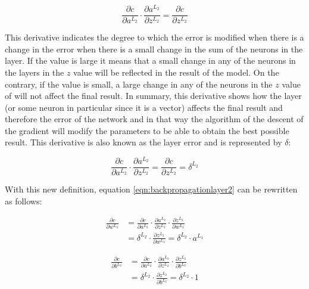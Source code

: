 \begin{equation}
     \frac{\partial c}{\partial a^{L_2}} \cdot \frac{\partial a^{L_2}}{\partial z^{L_2}} = \frac{\partial c}{\partial z^{L_2}}
\end{equation}

This derivative indicates the degree to which the error is modified when there is a change in the error when there is a small change in the sum of the neurons in the layer. If the value is large it means that a small change in any of the neurons in the layers in the $z$ value will be reflected in the result of the model. On the contrary, if the value is small, a large change in any of the neurons in the $z$ value of will not affect the final result. In summary, this derivative shows how the layer (or some neuron in particular since it is a vector) affects the final result and therefore the error of the network and in that way the algorithm of the descent of the gradient will modify the parameters to be able to obtain the best possible result. This derivative is also known as the layer error and is represented by $\delta$:

\begin{equation}
    \frac{\partial c}{\partial a^{L_2}} \cdot \frac{\partial a^{L_2}}{\partial z^{L_2}} = \frac{\partial c}{\partial z^{L_2}} = \delta^{L_2}
\end{equation}

With this new definition, equation \ref{eqn:backpropagationlayer2} can be rewritten as follows:

\begin{equation}
\begin{split}
     \frac{\partial c}{\partial w^{L_2}} &= \frac{\partial c}{\partial a^{L_2}} \cdot \frac{\partial a^{L_2}}{\partial z^{L_2}} \cdot \frac{\partial z^{L_2}}{\partial w^{L_2}} \\ &= \delta^{L_2} \cdot \frac{\partial z^{L_2}}{\partial w^{L_2}} = \delta^{L_2} \cdot a^{L_1}
\end{split}
\label{eqn:backpropagation_b}
\end{equation}

\begin{equation}
\begin{split}
     \frac{\partial c}{\partial b^{L_2}} &= \frac{\partial c}{\partial a^{L_2}} \cdot \frac{\partial a^{L_2}}{\partial z^{L_2}} \cdot \frac{\partial z^{L_2}}{\partial b^{L_2}} \\ &= \delta^{L_2} \cdot \frac{\partial z^{L_2}}{\partial b^{L_2}} = \delta^{L_2} \cdot 1
\end{split}
\label{eqn:backpropagation_w}
\end{equation}

